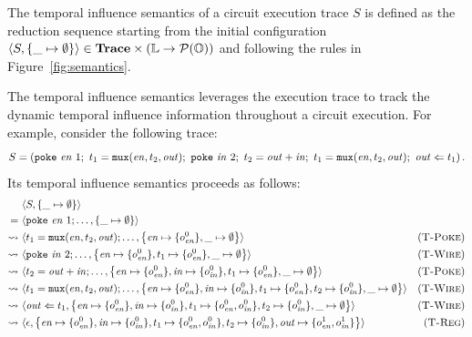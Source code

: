 \begin{definition}\label{def:semantics}
    The temporal influence semantics of a circuit execution trace $S$ is defined as the reduction sequence starting from the initial configuration $\langle S, \{\_ \mapsto \emptyset\}\rangle \in \mathbf{Trace} \times (\mathbb{L} \to \mathcal{P}(\mathbb{O}))$ and following the rules in Figure~\ref{fig:semantics}.
\end{definition}

The temporal influence semantics leverages the execution trace to track the dynamic temporal influence information throughout a circuit execution.
For example, consider the following trace:
\[
S = \left(\mathtt{poke\ } \mathit{en}\ 1;\ t_1 = \mathtt{mux}(\mathit{en}, t_2, \mathit{out});\ \mathtt{poke\ } \mathit{in}\ 2;\ t_2 = \mathit{out} + \mathit{in};\ t_1 = \mathtt{mux}(\mathit{en}, t_2, \mathit{out});\ \mathit{out} \Leftarrow t_1\right).
\]
Its temporal influence semantics proceeds as follows:
\[
\begin{aligned}
    & \langle S, \{\_ \mapsto \emptyset\}\rangle\\
    =\ & \langle \mathtt{poke\ } \mathit{en}\ 1; \dots, \{\_ \mapsto \emptyset\}\rangle & \\
    \rightsquigarrow\ & \langle t_1 = \mathtt{mux}(\mathit{en}, t_2, \mathit{out}); \dots, \left\{\mathit{en} \mapsto \{o_{\mathit{en}}^0\}, \_ \mapsto \emptyset\right\}\rangle & (\textsc{T-Poke})\\
    \rightsquigarrow\ & \langle \mathtt{poke\ } \mathit{in}\ 2; \dots, \left\{\mathit{en} \mapsto \{o_{\mathit{en}}^0\}, t_1 \mapsto \{o_{\mathit{en}}^0\}, \_ \mapsto \emptyset\right\}\rangle & (\textsc{T-Wire})\\
    \rightsquigarrow\ & \langle t_2 = \mathit{out} + \mathit{in}; \dots, \left\{\mathit{en} \mapsto \{o_{\mathit{en}}^0\}, \mathit{in} \mapsto \{o_{\mathit{in}}^0\}, t_1 \mapsto \{o_{\mathit{en}}^0\}, \_ \mapsto \emptyset\right\}\rangle & (\textsc{T-Poke})\\
    \rightsquigarrow\ & \langle t_1 = \mathtt{mux}(\mathit{en}, t_2, \mathit{out}); \dots, \left\{\mathit{en} \mapsto \{o_{\mathit{en}}^0\}, \mathit{in} \mapsto \{o_{\mathit{in}}^0\}, t_1 \mapsto \{o_{\mathit{en}}^0\}, t_2 \mapsto\{o_{\mathit{in}}^0\}, \_ \mapsto \emptyset\right\}\rangle & (\textsc{T-Wire})\\
    \rightsquigarrow\ & \langle \mathit{out} \Leftarrow t_1, \left\{\mathit{en} \mapsto \{o_{\mathit{en}}^0\}, \mathit{in} \mapsto \{o_{\mathit{in}}^0\}, t_1 \mapsto \{o_{\mathit{en}}^0, o_{\mathit{in}}^0\}, t_2 \mapsto\{o_{\mathit{in}}^0\}, \_ \mapsto \emptyset\right\}\rangle & (\textsc{T-Wire})\\
    \rightsquigarrow\ & \langle \epsilon, \left\{\mathit{en} \mapsto \{o_{\mathit{en}}^0\}, \mathit{in} \mapsto \{o_{\mathit{in}}^0\}, t_1 \mapsto \{o_{\mathit{en}}^0, o_{\mathit{in}}^0\}, t_2 \mapsto\{o_{\mathit{in}}^0\}, \mathit{out} \mapsto \{o_{\mathit{en}}^1, o_{\mathit{in}}^1\}\right\}\rangle & (\textsc{T-Reg})\\
\end{aligned}
\]

